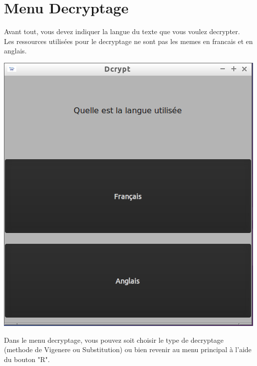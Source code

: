 \documentclass[a4]{article}
\begin{document}
	\section{Menu Decryptage}
			Avant tout, vous devez indiquer la langue du texte que vous voulez decrypter. \\
 		Les ressources utilisées pour le decryptage ne sont pas les memes en francais et en anglais.
		\begin{center}\includegraphics[scale=0.4]{8.png}\end{center}
		Dans le menu decryptage, vous pouvez soit choisir le type de decryptage (methode de Vigenere ou 			Substitution) ou bien revenir au menu principal à l'aide du bouton "R".
\end{document}
